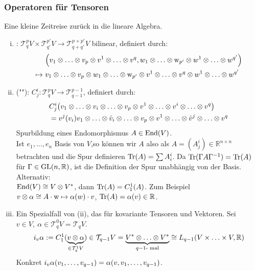\subsubsection{Operatoren für Tensoren}
\label{ssub:176}
Eine kleine Zeitreise zurück in die lineare Algebra.
\begin{enumerate}[(i)]
\item {}: $\mathcal{T}_q^p V \times \mathcal{T}_{q'}^{p'} V \to \mathcal{T}_{q+q'}^{p+p'	} V$ bilinear, definiert durch:
\begin{align*}
&\enbrace*{v_1\otimes \ldots \otimes v_p \otimes v^1 \otimes \ldots \otimes v^q, w_1\otimes \ldots \otimes \w_{p'} \otimes w^1 \otimes \ldots \otimes w^{q'}}\\
\mapsto\ &v_1\otimes \ldots \otimes v_p \otimes w_1\otimes \ldots \otimes \w_{p'}\otimes v^1 \otimes \ldots \otimes v^q \otimes w^1 \otimes \ldots \otimes w^{q'}
\end{align*}
\item {} (""): $C_j^i: \mathcal{T}_q^p V \to \mathcal{T}_{q-1}^{p-1}$, definiert durch:
\begin{align*}
&C_j^i\enbrace*{v_1\otimes \ldots \otimes v_i \otimes \ldots \otimes v_p \otimes v^1\otimes \ldots \otimes v^i \otimes \ldots \otimes v^q}\\
&= v^j(v_i) v_1\otimes \ldots \otimes \hat{v}_i \otimes \ldots \otimes v_p \otimes v^1\otimes \ldots \otimes \hat{v}^j \otimes \ldots \otimes v^q
\end{align*}
Spurbildung eines Endomorphismus $A\in \operatorname{End}(V)$.\\
Ist $e_1,\ldots, e_n$ Basis von $V$,so können wir $A$ also als $A = (A_j^i)\in \mathds{R}^{n\times n}$ betrachten und die Spur definieren $\operatorname{Tr}(A) = \sum A_i^i$. Da $\operatorname{Tr}(\Gamma A \Gamma^{-1}) = \operatorname{Tr}(A)$ für $\Gamma \in \operatorname{GL}(n,\mathbb{R})$, ist die Definition der Spur unabhängig von der Basis.\\
Alternativ:\\
$\operatorname{End}(V) \cong V\otimes V^*$, dann $\operatorname{Tr}(A) = C_1^1(A)$. Zum Beispiel $v\otimes \alpha \cong A\cdot \mathrm{w} \mapsto \alpha(w)\cdot v$, $\operatorname{Tr}(A) = \alpha(v) \in \mathbb{R}$.
\item Ein Spezialfall von (ii), das  für kovariante Tensoren und Vektoren. Sei $v\in V,\ \alpha\in \mathcal{T}_q^0 V = \mathcal{T}_q V$.
\[
i_v \alpha := C_1^1(\underbrace{v\otimes \alpha}_{\in \mathcal{T}_q^1 V}) \in \mathcal{T}_{q-1} V = \underbrace{V^*\otimes \ldots \otimes V^*}_{q-1 \text{- mal}} \cong L_{q-1}(V\times \ldots \times V,\mathbb{R})
\]
Konkret $i_v \alpha(v_1,\ldots,v_{q-1}) = \alpha(v,v_1,\ldots,v_{q-1})$.
\end{enumerate}
